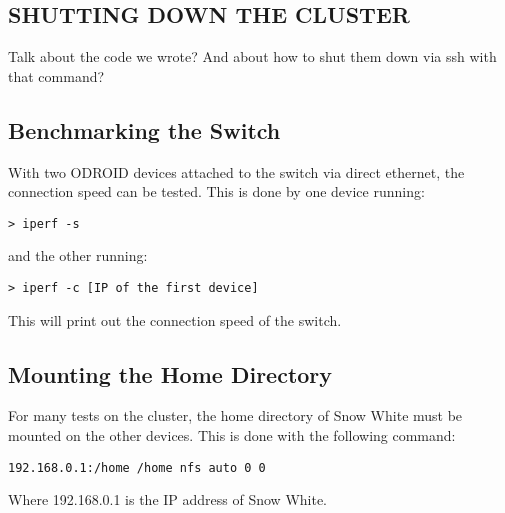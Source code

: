 \subsection{SHUTTING DOWN THE CLUSTER}
Talk about the code we wrote? And about how to shut them down via ssh with that command?

\subsection{Benchmarking the Switch}
With two ODROID devices attached to the switch via direct ethernet, the connection speed can be tested. This is done by one device running:
\begin{lstlisting}
> iperf -s
\end{lstlisting}
and the other running:
\begin{lstlisting}
> iperf -c [IP of the first device]
\end{lstlisting}
This will print out the connection speed of the switch.

\subsection{Mounting the Home Directory}
For many tests on the cluster, the home directory of Snow White must be mounted on the other devices. This is done with the following command:
\begin{lstlisting}
192.168.0.1:/home /home nfs auto 0 0
\end{lstlisting}
Where 192.168.0.1 is the IP address of Snow White.

